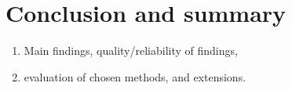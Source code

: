 \documentclass[report]{subfiles}
\begin{document}
\section{Conclusion and summary}

\begin{enumerate}
\item Main findings, quality/reliability of findings,
\item evaluation of chosen methods, and extensions.
\end{enumerate}
\end{document}
